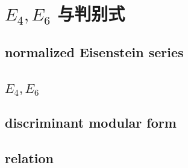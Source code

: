 \section{\texorpdfstring{\(E_4,E_6\)}{E₄, E₆} 与判别式}
\label{b3:sec:2304}


\subsection{normalized Eisenstein series}
\label{b3:subsec:230401}

\subsection{\texorpdfstring{\(E_4,E_6\)}{E4,E6}}
\label{b3:subsec:230402}

\subsection{discriminant modular form}
\label{b3:subsec:230403}

\subsection{relation}
\label{b3:subsec:230404}


